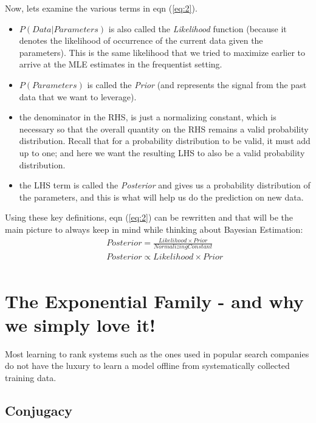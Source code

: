 \documentclass[a4paper]{article}
\begin{document}
\noindent Now, lets examine the various terms in eqn (\ref{eq:2}). 
\begin{itemize}
\item $P(Data|Parameters)$ is also called the \textit{Likelihood} function (because it denotes the likelihood of occurrence of the current data given the parameters). This is the same likelihood that we tried to maximize earlier to arrive at the MLE estimates in the frequentist setting.
\item $P(Parameters)$ is called the \textit{Prior} (and represents the signal from the past data that we want to leverage).
\item the denominator in the RHS, is just a normalizing constant, which is necessary so that the overall quantity on the RHS remains a valid probability distribution. Recall that for a probability distribution to be valid, it must add up to one; and here we want the resulting LHS to also be a valid probability distribution.
\item the LHS term is called the \textit{Posterior} and gives us a probability distribution of the parameters, and this is what will help us do the prediction on new data.
\end{itemize}

\noindent Using these key definitions, eqn (\ref{eq:2}) can be rewritten and that will be the main picture to always keep in mind while thinking about Bayesian Estimation:
\begin{equation} \label{eq:3}
\begin{aligned}
& & Posterior = \frac{ Likelihood \times Prior}{Normalizing Constant}\\
& & Posterior \propto Likelihood \times Prior \\
\end{aligned}
\end{equation}



\section{The Exponential Family - and why we simply love it!}
\noindent Most learning to rank systems such as the ones used in popular search companies do not have the luxury to learn a model offline from systematically collected training data.



\subsection{Conjugacy}
\end{document}
